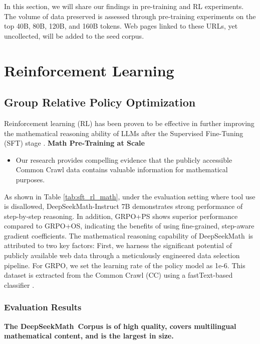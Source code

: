 \begin{itemize}[topsep=0pt]
\begin{itemize}[topsep=0pt]
In this section, we will share our findings in pre-training and RL experiments. The volume of data preserved is assessed through pre-training experiments on the top 40B, 80B, 120B, and 160B tokens. Web pages linked to these URLs, yet uncollected, will be added to the seed corpus. \section{Reinforcement Learning}

\subsection{Group Relative Policy Optimization} Reinforcement learning (RL) has been proven to be effective in further improving the mathematical reasoning ability of LLMs after the Supervised Fine-Tuning (SFT) stage \citep{wang2023math,wizardmath}. \textbf{Math Pre-Training at Scale}

\begin{itemize}[topsep=0pt]
    \item Our research provides compelling evidence that the publicly accessible Common Crawl data contains valuable information for mathematical purposes. \end{itemize}

As shown in Table \ref{tab:sft_rl_math}, under the evaluation setting where tool use is disallowed, DeepSeekMath-Instruct 7B demonstrates strong performance of step-by-step reasoning. In addition, GRPO+PS shows superior performance compared to GRPO+OS, indicating the benefits of using fine-grained, step-aware gradient coefficients. The mathematical reasoning capability of DeepSeekMath~is attributed to two key factors: First, we harness the significant potential of publicly available web data through a meticulously engineered data selection pipeline. For GRPO, we set the learning rate of the policy model as 1e-6. This dataset is extracted from the Common Crawl (CC) using a fastText-based classifier \citep{joulin2016fasttext}. \subsubsection{Evaluation Results}

\textbf{The DeepSeekMath~Corpus is of high quality, covers multilingual mathematical content, and is the largest in size.}


\end{itemize}
\end{itemize}
